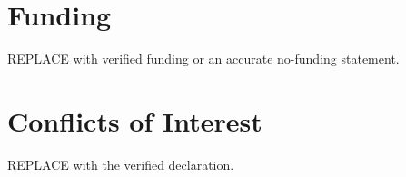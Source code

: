 \documentclass[11pt,a4paper]{article}
\begin{document}
\section*{Funding}
REPLACE with verified funding or an accurate no-funding statement.

\section*{Conflicts of Interest}
REPLACE with the verified declaration.



\end{document}
